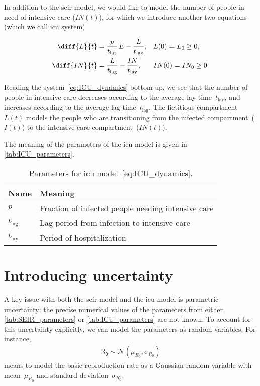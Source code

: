 \documentclass{article}
\newcommand{\rv}[1]{\mathsf{#1}}
\newcommand{\exposed}{E}
\newcommand{\infected}{I}
\newcommand{\lag}{L}
\newcommand{\intensive}{IN}
\newcommand{\reproduction}{R_0}
\newcommand{\tlatent}{t_{\text{lat}}}
\newcommand{\tlay}{t_{\text{lay}}}
\newcommand{\tlag}{t_{\text{lag}}}
\newcommand{\ICUpercentage}{p}
\begin{document}
In addition to the \gls{seir} model, we would like to model the number of people in need of intensive care ($\intensive(t)$), for which we introduce another two equations (which we call \gls{icu} system)

\begin{subequations}
    \label{eq:ICU_dynamics}
    \begin{align}
        \diff{\lag}{t} &= \frac{\ICUpercentage}{\tlatent} \, \exposed - \frac{\lag}{\tlag}, && \lag(0) = \lag_0 \geq 0, \\
        \diff{\intensive}{t} &= \frac{\lag}{\tlag} - \frac{\intensive}{\tlay}, && \intensive(0) = \intensive_0 \geq 0.
    \end{align}
\end{subequations}

Reading the system~\eqref{eq:ICU_dynamics} bottom-up, we see that the number of people in intensive care decreases according to the average lay time~$\tlay$, and increases according to the average lag time~$\tlag$.
The fictitious compartment~$\lag(t)$ models the people who are transitioning from the infected compartment~($\infected(t)$) to the intensive-care compartment~($\intensive(t)$).

The meaning of the parameters of the \gls{icu} model is given in \autoref{tab:ICU_parameters}.

\begin{table}[h!]
    \centering
    \caption{Parameters for \gls{icu} model~\eqref{eq:ICU_dynamics}.\label{tab:ICU_parameters}}
    \begin{tabular}{ll}
        \toprule
        Name & Meaning \\
        \midrule
        $\ICUpercentage$ & Fraction of infected people needing intensive care \\
        $\tlag$ & Lag period from infection to intensive care \\
        $\tlay$ & Period of hospitalization \\
        \bottomrule
    \end{tabular}
\end{table}

\section{Introducing uncertainty}

A key issue with both the \gls{seir} model and the \gls{icu} model is parametric uncertainty: the precise numerical values of the parameters from either \autoref{tab:SEIR_parameters} or \autoref{tab:ICU_parameters} are not known.
To account for this uncertainty explicitly, we can model the parameters as random variables.
For instance,
\begin{align}
    \rv{\reproduction} \sim \mathcal{N}(\mu_{\reproduction}, \sigma_{\reproduction})
\end{align}
means to model the basic reproduction rate as a Gaussian random variable with mean~$\mu_{\reproduction}$ and standard deviation~$\sigma_{\reproduction}$.
\end{document}
